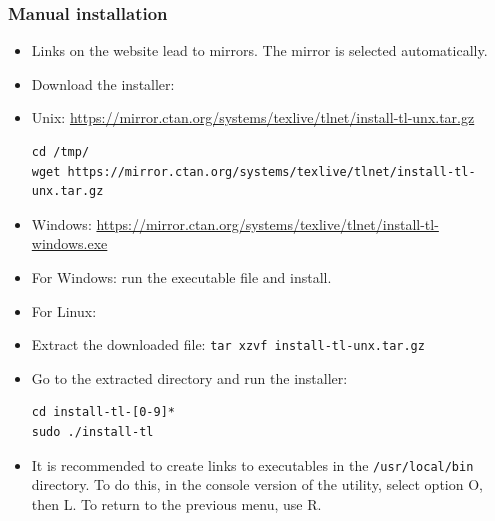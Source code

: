 \documentclass{article}
\begin{document}
\subsubsection{Manual installation}
\begin{itemize}
\item Links on the website lead to mirrors. The mirror is selected automatically.
\item Download the installer:
\item Unix: \url{https://mirror.ctan.org/systems/texlive/tlnet/install-tl-unx.tar.gz}
\begin{verbatim}
cd /tmp/
wget https://mirror.ctan.org/systems/texlive/tlnet/install-tl-unx.tar.gz
\end{verbatim}
\item Windows: \url{https://mirror.ctan.org/systems/texlive/tlnet/install-tl-windows.exe}
\item For Windows: run the executable file and install.
\item For Linux:
\item Extract the downloaded file: \texttt{tar xzvf install-tl-unx.tar.gz}
\item Go to the extracted directory and run the installer:
\begin{verbatim}
cd install-tl-[0-9]*
sudo ./install-tl
\end{verbatim}
\item It is recommended to create links to executables in the \texttt{/usr/local/bin} directory. To do this, in the console version of the utility, select option O, then L. To return to the previous menu, use R.
\end{itemize}
\end{document}
